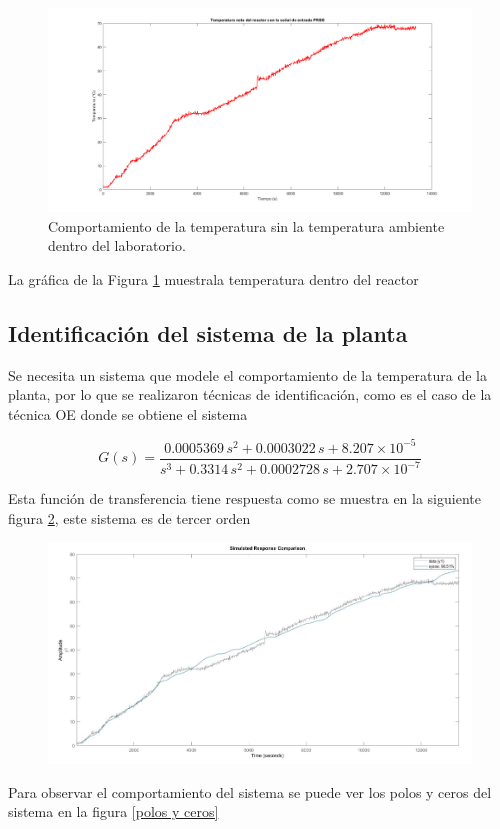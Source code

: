 \documentclass[12pt]{article}
\begin{document}
	\begin{figure}[h!]
		\centering
		\includegraphics[width=.7\linewidth]{imagenes/temp_neta}
		\caption{Comportamiento de la temperatura sin la temperatura ambiente dentro del laboratorio. }
		\label{ Temperatura neta_con PRBS}
	\end{figure}
	
	La gráfica de la Figura \ref{ Temperatura neta_con PRBS} muestrala temperatura dentro del reactor 
	
	
	
	\subsection{Identificación del sistema de la planta}	
	
	Se necesita un sistema que modele el comportamiento de la temperatura de la planta, por lo que se realizaron técnicas de identificación, como es el caso de la técnica OE donde se obtiene el sistema 
	
	
	\begin{equation}
		G(s) = \frac{0.0005369 \, s^2 + 0.0003022 \, s + 8.207 \times 10^{-5}}{s^3 + 0.3314 \, s^2 + 0.0002728 \, s + 2.707 \times 10^{-7}}
	\end{equation}
	
	Esta función de transferencia tiene respuesta como se muestra en la siguiente figura \ref{fig:identificacion}, este sistema es de tercer orden
	
	
	\begin{figure} [h!]
		\centering
		\includegraphics[width=0.8\linewidth]{imagenes/identificacion}
		\caption{}
		\label{fig:identificacion}
	\end{figure}
	Para observar el comportamiento del sistema se puede ver los polos y ceros del sistema en la figura \ref{polos y ceros}
	
\end{document}
